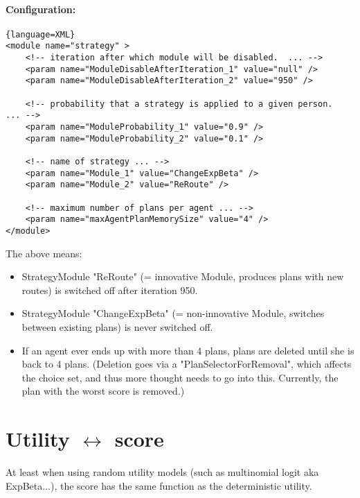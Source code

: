 \paragraph{Configuration:}
\begin{lstlisting}{language=XML}
<module name="strategy" >
	<!-- iteration after which module will be disabled.  ... -->
	<param name="ModuleDisableAfterIteration_1" value="null" />
	<param name="ModuleDisableAfterIteration_2" value="950" />

	<!-- probability that a strategy is applied to a given person.  ... -->
	<param name="ModuleProbability_1" value="0.9" />
	<param name="ModuleProbability_2" value="0.1" />

	<!-- name of strategy ... -->
	<param name="Module_1" value="ChangeExpBeta" />
	<param name="Module_2" value="ReRoute" />

	<!-- maximum number of plans per agent ... -->
	<param name="maxAgentPlanMemorySize" value="4" />
</module>
\end{lstlisting}


The above means:
\begin{itemize}
	\item StrategyModule "ReRoute" (= innovative Module, produces plans with new routes) is switched off after iteration 950.
	\item StrategyModule "ChangeExpBeta" (= non-innovative Module, switches between existing plans) is never switched off.
	\item If an agent ever ends up with more than 4 plans, plans are deleted  until she is back to 4 plans. (Deletion goes via a  "PlanSelectorForRemoval", which affects the choice set, and thus more  thought needs to go into this. Currently, the plan with the worst  score is removed.)
\end{itemize}

\section{Utility $\leftrightarrow$ score}


At least when using random utility models (such as multinomial logit   aka ExpBeta...), the score has the same function as the deterministic   utility.
